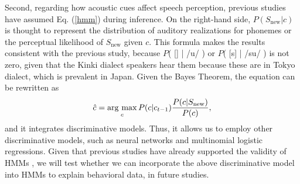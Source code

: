 \documentclass[a4paper,11pt,twocolumn]{article}
\newcommand{\argmax}{\mathop{\rm arg~max}\limits}
\begin{document}
Second, regarding how acoustic cues affect speech perception, previous studies \cite{wilson2013bayesian, kishiyama2021influence} have assumed Eq. (\ref{hmm}) during inference. On the right-hand side, $P(S_{\text{new}}|c)$ is thought to represent the distribution of auditory realizations for phonemes or the perceptual likelihood of $S_{\text{new}}$ given $c$. This formula makes the results consistent with the previous study, because $P$( [\textsubring{\textturnm}] | /u/ ) or $P$( [s] | /su/ ) is not zero, given that the Kinki dialect speakers hear them because these are in Tokyo dialect, which is prevalent in Japan. Given the Bayes Theorem, the equation can be rewritten as
%
\begin{equation} \label{disc}
    \hat{c} = \argmax_{c} P(c | c_{t-1}) \frac{P(c|S_{\text{new}})}{P(c)},
\end{equation}
%
and it integrates discriminative models.
Thus, it allows us to employ other discriminative models, such as neural networks and multinomial logistic regressions. Given that previous studies have already supported the validity of HMMs \cite{kishiyama2021influence}, we will test whether we can incorporate the above discriminative model into HMMs to explain behavioral data, in future studies.

% 




\end{document}

